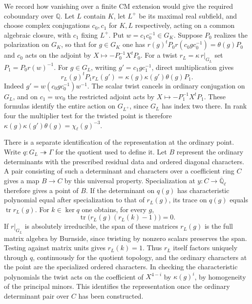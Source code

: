 \documentclass[11pt]{amsart}
\theoremstyle{definition}
\theoremstyle{remark}
\begin{document}
We record how vanishing over a finite CM extension would give the
required coboundary over $\mathbb Q$. Let $L$ contain $K$, let
$L^+$ be its maximal real subfield, and choose complex conjugations
$c_0,c_1$ for $K,L$ respectively, acting on a common algebraic
closure, with $c_1$ fixing $L^+$. Put $w=c_1c_0^{-1}\in G_K$.
Suppose $P_0$ realizes the polarization on $G_K$, so that for
$g\in G_K$ one has
$r(g)^tP_0r(c_0gc_0^{-1})=\theta(g)P_0$ and $c_0$ acts on the
adjoint by $X\mapsto-P_0^{-1}X^tP_0$. For a twist
$r_L=\kappa\,r|_{G_L}$ set $P_1=P_0r(w)^{-1}$.
For $g\in G_L$, writing $g'=c_1gc_1^{-1}$, direct multiplication gives
\[
 r_L(g)^t P_1 r_L(g')=\kappa(g)\kappa(g')\theta(g)P_1 .
\]
Indeed $g'=w(c_0gc_0^{-1})w^{-1}$. The scalar twist cancels in
ordinary conjugation on $G_L$, and on $c_1=wc_0$ the restricted
adjoint acts by $X\mapsto-P_1^{-1}X^tP_1$. These formulas identify
the entire action on $G_{L^+}$, since $G_L$ has index two there.
In rank four the multiplier test for the twisted point is therefore
$\kappa(g)\kappa(g')\theta(g)=\chi_\ell(g)^{-3}$.

There is a separate identification of the representation at the
ordinary point. Write $q:G_L\twoheadrightarrow\Gamma$ for the
quotient used to define it. Let $B$ represent the ordinary
determinants with the prescribed residual data and ordered diagonal
characters. A pair consisting of such a determinant and characters
over a coefficient ring $C$ gives a map $B\to C$ by this universal
property. Specialization at $y:C\to\overline{\mathbb Q}_\ell$
therefore gives a point of $B$. If the determinant on $q(g)$
has characteristic polynomial equal after specialization to that of
$r_L(g)$, its trace on $q(g)$ equals $\operatorname{tr}r_L(g)$.
For $k\in\ker q$ one obtains, for every $g$,
\[
 \operatorname{tr}\bigl(r_L(g)(r_L(k)-1)\bigr)=0 .
\]
If $r|_{G_L}$ is absolutely irreducible, the span of these matrices
$r_L(g)$ is the full matrix algebra by Burnside, since twisting by
nonzero scalars preserves the span. Testing against matrix units
gives $r_L(k)=1$. Thus $r_L$ itself factors uniquely through
$q$, continuously for the quotient topology, and the ordinary
characters at the point are the specialized ordered characters.
In checking the characteristic polynomials the twist acts on the
coefficient of $X^{4-i}$ by $\kappa(g)^i$, by homogeneity of the
principal minors. This identifies the representation once the
ordinary determinant pair over $C$ has been constructed.
\end{document}
